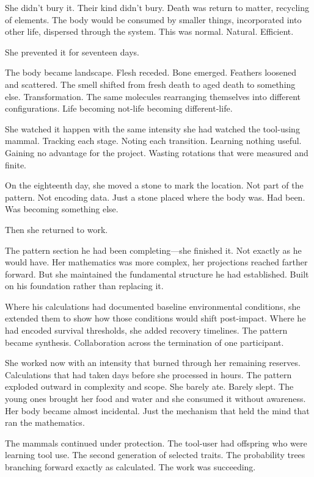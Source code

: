 She didn't bury it. Their kind didn't bury. Death was return to matter, recycling of elements. The body would be consumed by smaller things, incorporated into other life, dispersed through the system. This was normal. Natural. Efficient.

She prevented it for seventeen days.

The body became landscape. Flesh receded. Bone emerged. Feathers loosened and scattered. The smell shifted from fresh death to aged death to something else. Transformation. The same molecules rearranging themselves into different configurations. Life becoming not-life becoming different-life.

She watched it happen with the same intensity she had watched the tool-using mammal. Tracking each stage. Noting each transition. Learning nothing useful. Gaining no advantage for the project. Wasting rotations that were measured and finite.

On the eighteenth day, she moved a stone to mark the location. Not part of the pattern. Not encoding data. Just a stone placed where the body was. Had been. Was becoming something else.

Then she returned to work.

The pattern section he had been completing—she finished it. Not exactly as he would have. Her mathematics was more complex, her projections reached farther forward. But she maintained the fundamental structure he had established. Built on his foundation rather than replacing it.

Where his calculations had documented baseline environmental conditions, she extended them to show how those conditions would shift post-impact. Where he had encoded survival thresholds, she added recovery timelines. The pattern became synthesis. Collaboration across the termination of one participant.

She worked now with an intensity that burned through her remaining reserves. Calculations that had taken days before she processed in hours. The pattern exploded outward in complexity and scope. She barely ate. Barely slept. The young ones brought her food and water and she consumed it without awareness. Her body became almost incidental. Just the mechanism that held the mind that ran the mathematics.

The mammals continued under protection. The tool-user had offspring who were learning tool use. The second generation of selected traits. The probability trees branching forward exactly as calculated. The work was succeeding.

